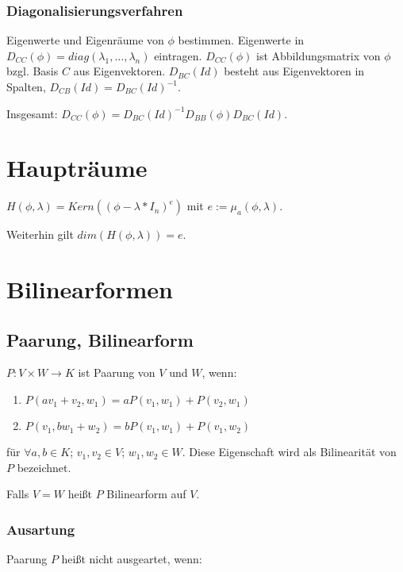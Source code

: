 \subsubsection*{Diagonalisierungsverfahren}

Eigenwerte und Eigenräume von $\phi$ bestimmen. Eigenwerte in $D_{CC}(\phi) = diag(\lambda_1, \hdots, \lambda_n)$ eintragen. $D_{CC}(\phi)$ ist Abbildungsmatrix von $\phi$ bzgl. Basis $C$ aus Eigenvektoren. $D_{BC}(Id)$ besteht aus Eigenvektoren in Spalten, $D_{CB}(Id) = D_{BC}(Id)^{-1}$.

Insgesamt: $D_{CC}(\phi) = D_{BC}(Id)^{-1} D_{BB}(\phi) D_{BC}(Id)$.

\section*{Haupträume}

$H(\phi, \lambda) = Kern((\phi - \lambda * I_n)^e)$ mit $e := \mu_a(\phi, \lambda)$.

Weiterhin gilt $dim(H(\phi, \lambda))=e$.

\section*{Bilinearformen}

\subsection*{Paarung, Bilinearform}

$P : V \times W \rightarrow K$ ist Paarung von $V$ und $W$, wenn:

\begin{enumerate}[label=(\alph*)]
	\item $P(av_1 + v_2, w_1) = aP(v_1, w_1) + P(v_2, w_1)$
	\item $P(v_1, bw_1 + w_2) = bP(v_1, w_1) + P(v_1, w_2)$
\end{enumerate}

für $\forall a, b \in K$; $v_1, v_2 \in V$; $w_1, w_2 \in W$. Diese Eigenschaft wird als Bilinearität von $P$ bezeichnet.

Falls $V=W$ heißt $P$ Bilinearform auf $V$.

\subsubsection*{Ausartung}

Paarung $P$ heißt nicht ausgeartet, wenn:

